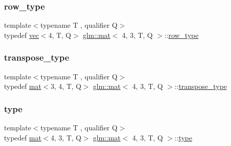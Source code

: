 \subsubsection{\texorpdfstring{row\+\_\+type}{row\_type}}
{\footnotesize\ttfamily template$<$typename T , qualifier Q$>$ \\
typedef \mbox{\hyperlink{structglm_1_1vec}{vec}}$<$4, T, Q$>$ \mbox{\hyperlink{structglm_1_1mat}{glm\+::mat}}$<$ 4, 3, T, Q $>$\+::\mbox{\hyperlink{structglm_1_1mat_3_014_00_013_00_01_t_00_01_q_01_4_ab68daf8d119fa525c762d6ba0bc08538}{row\+\_\+type}}}

\mbox{\label{structglm_1_1mat_3_014_00_013_00_01_t_00_01_q_01_4_ab3a05b21cd6b51243140b2bdbf77108a}} 
\subsubsection{\texorpdfstring{transpose\+\_\+type}{transpose\_type}}
{\footnotesize\ttfamily template$<$typename T , qualifier Q$>$ \\
typedef \mbox{\hyperlink{structglm_1_1mat}{mat}}$<$3, 4, T, Q$>$ \mbox{\hyperlink{structglm_1_1mat}{glm\+::mat}}$<$ 4, 3, T, Q $>$\+::\mbox{\hyperlink{structglm_1_1mat_3_014_00_013_00_01_t_00_01_q_01_4_ab3a05b21cd6b51243140b2bdbf77108a}{transpose\+\_\+type}}}

\mbox{\label{structglm_1_1mat_3_014_00_013_00_01_t_00_01_q_01_4_a5c9dc0bf9dfa3af93210f80d90257861}} 
\subsubsection{\texorpdfstring{type}{type}}
{\footnotesize\ttfamily template$<$typename T , qualifier Q$>$ \\
typedef \mbox{\hyperlink{structglm_1_1mat}{mat}}$<$4, 3, T, Q$>$ \mbox{\hyperlink{structglm_1_1mat}{glm\+::mat}}$<$ 4, 3, T, Q $>$\+::\mbox{\hyperlink{structglm_1_1mat_3_014_00_013_00_01_t_00_01_q_01_4_a5c9dc0bf9dfa3af93210f80d90257861}{type}}}

